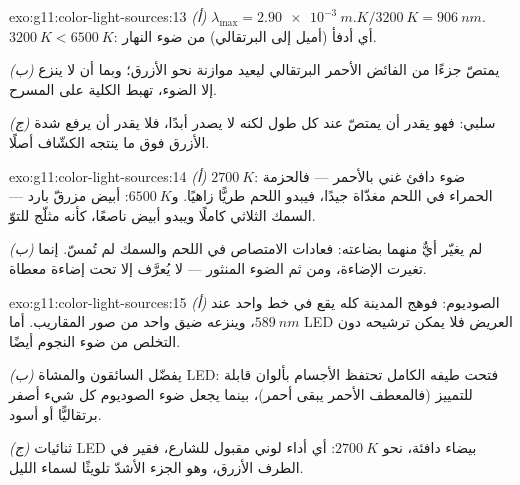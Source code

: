 \begin{solution}{exo:g11:color-light-sources:13}
\emph{(أ)} $\lambda_{\max} = \qty{2.90e-3}{m.K}/\qty{3200}{K} =
\qty{906}{nm}$.  $\qty{3200}{K} < \qty{6500}{K}$:
أي أدفأ (أميل إلى البرتقالي) من ضوء النهار.

\emph{(ب)} يمتصّ  جزءًا من الفائض الأحمر البرتقالي ليعيد موازنة
 نحو الأزرق؛ وبما أن  لا ينزع إلا الضوء، تهبط
 الكلية على المسرح.

\emph{(ج)}  سلبي: فهو يقدر أن يمتصّ عند كل طول  لكنه
لا يصدر أبدًا، فلا  يقدر أن يرفع شدة الأزرق فوق ما ينتجه
الكشّاف أصلًا.
\end{solution}

\begin{solution}{exo:g11:color-light-sources:14}
\emph{(أ)} $\qty{2700}{K}$: ضوء دافئ غني بالأحمر --- فالحزمة الحمراء في اللحم
مغذّاة جيدًا، فيبدو اللحم طريًّا زاهيًا. و$\qty{6500}{K}$: أبيض
مزرقّ بارد ---  السمك الثلاثي كاملًا ويبدو أبيض
ناصعًا، كأنه مثلّج للتوّ.

\emph{(ب)} لم يغيّر أيٌّ منهما بضاعته: فعادات الامتصاص في اللحم
والسمك لم تُمسّ. إنما تغيرت الإضاءة، ومن ثم الضوء المنثور ---
 لا يُعرَّف إلا تحت إضاءة
معطاة.
\end{solution}

\begin{solution}{exo:g11:color-light-sources:15}
\emph{(أ)} الصوديوم: فوهج المدينة كله يقع في خط واحد عند
$\qty{589}{nm}$، وينزعه  ضيق واحد من صور
المقاريب. أما  LED العريض فلا يمكن ترشيحه دون التخلص
من ضوء النجوم أيضًا.

\emph{(ب)} يفضّل السائقون والمشاة LED: فتحت طيفه الكامل
تحتفظ الأجسام بألوان قابلة للتمييز (فالمعطف الأحمر يبقى أحمر)،
بينما يجعل ضوء الصوديوم كل شيء أصفر برتقاليًّا أو أسود.

\emph{(ج)} ثنائيات LED بيضاء دافئة، نحو $\qty{2700}{K}$: أي أداء لوني
مقبول للشارع،  فقير في الطرف الأزرق، وهو الجزء
الأشدّ تلويثًا لسماء الليل.
\end{solution}

